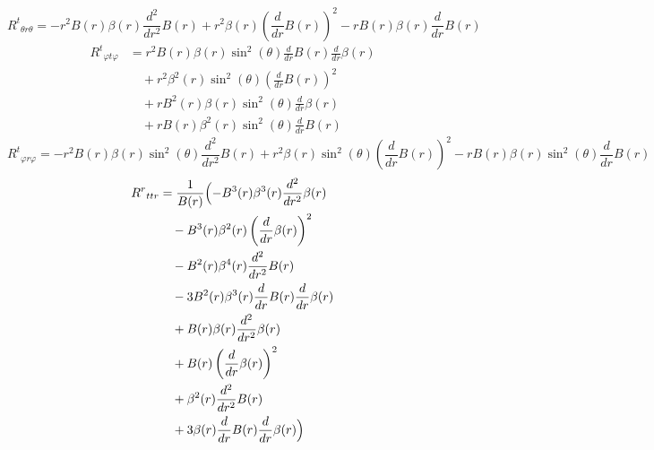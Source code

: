 \documentclass[11pt,a4paper]{article}
\newcommand{\riemann}[4]{R^{#1}{}_{#2 #3 #4}}
\begin{document}
\begin{dmath*}
  \riemann{t}{\theta}{r}{\theta} = - r^{2} B{\left(r \right)} \beta{\left(r \right)} \frac{d^{2}}{d r^{2}} B{\left(r \right)} + r^{2} \beta{\left(r \right)} \left(\frac{d}{d r} B{\left(r \right)}\right)^{2} - r B{\left(r \right)} \beta{\left(r \right)} \frac{d}{d r} B{\left(r \right)}
\end{dmath*}
\begin{align*}
  \riemann{t}{\varphi}{t}{\varphi} &= r^{2} B{\left(r \right)} \beta{\left(r \right)} \sin^{2}{\left(\theta \right)} \frac{d}{d r} B{\left(r \right)} \frac{d}{d r} \beta{\left(r \right)} \\
  &\quad + r^{2} \beta^{2}{\left(r \right)} \sin^{2}{\left(\theta \right)} \left(\frac{d}{d r} B{\left(r \right)}\right)^{2} \\
  &\quad + r B^{2}{\left(r \right)} \beta{\left(r \right)} \sin^{2}{\left(\theta \right)} \frac{d}{d r} \beta{\left(r \right)} \\
  &\quad + r B{\left(r \right)} \beta^{2}{\left(r \right)} \sin^{2}{\left(\theta \right)} \frac{d}{d r} B{\left(r \right)}
\end{align*}
\begin{dmath*}
  \riemann{t}{\varphi}{r}{\varphi} = - r^{2} B{\left(r \right)} \beta{\left(r \right)} \sin^{2}{\left(\theta \right)} \frac{d^{2}}{d r^{2}} B{\left(r \right)} + r^{2} \beta{\left(r \right)} \sin^{2}{\left(\theta \right)} \left(\frac{d}{d r} B{\left(r \right)}\right)^{2} - r B{\left(r \right)} \beta{\left(r \right)} \sin^{2}{\left(\theta \right)} \frac{d}{d r} B{\left(r \right)}
\end{dmath*}
\begin{align*}
  \riemann{r}{t}{t}{r} &= \frac{1}{B{\left(r \right)}}\Bigl(- B^{3}{\left(r \right)} \beta^{3}{\left(r \right)} \frac{d^{2}}{d r^{2}} \beta{\left(r \right)} \\
  &\quad - B^{3}{\left(r \right)} \beta^{2}{\left(r \right)} \left(\frac{d}{d r} \beta{\left(r \right)}\right)^{2} \\
  &\quad - B^{2}{\left(r \right)} \beta^{4}{\left(r \right)} \frac{d^{2}}{d r^{2}} B{\left(r \right)} \\
  &\quad - 3 B^{2}{\left(r \right)} \beta^{3}{\left(r \right)} \frac{d}{d r} B{\left(r \right)} \frac{d}{d r} \beta{\left(r \right)} \\
  &\quad + B{\left(r \right)} \beta{\left(r \right)} \frac{d^{2}}{d r^{2}} \beta{\left(r \right)} \\
  &\quad + B{\left(r \right)} \left(\frac{d}{d r} \beta{\left(r \right)}\right)^{2} \\
  &\quad + \beta^{2}{\left(r \right)} \frac{d^{2}}{d r^{2}} B{\left(r \right)} \\
  &\quad + 3 \beta{\left(r \right)} \frac{d}{d r} B{\left(r \right)} \frac{d}{d r} \beta{\left(r \right)}\Bigr)
\end{align*}
\end{document}
